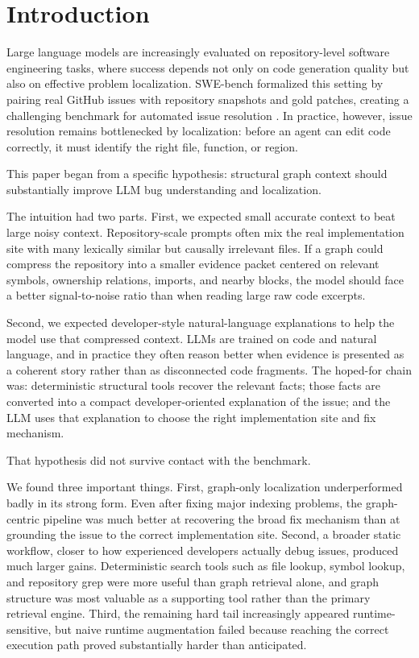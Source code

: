 \documentclass[11pt]{article}
\begin{document}
\section{Introduction}

Large language models are increasingly evaluated on repository-level software engineering tasks, where success depends not only on code generation quality but also on effective problem localization. SWE-bench formalized this setting by pairing real GitHub issues with repository snapshots and gold patches, creating a challenging benchmark for automated issue resolution \citep{jimenez2023swebench}. In practice, however, issue resolution remains bottlenecked by localization: before an agent can edit code correctly, it must identify the right file, function, or region.

This paper began from a specific hypothesis: structural graph context should substantially improve LLM bug understanding and localization.

The intuition had two parts. First, we expected small accurate context to beat large noisy context. Repository-scale prompts often mix the real implementation site with many lexically similar but causally irrelevant files. If a graph could compress the repository into a smaller evidence packet centered on relevant symbols, ownership relations, imports, and nearby blocks, the model should face a better signal-to-noise ratio than when reading large raw code excerpts.

Second, we expected developer-style natural-language explanations to help the model use that compressed context. LLMs are trained on code and natural language, and in practice they often reason better when evidence is presented as a coherent story rather than as disconnected code fragments. The hoped-for chain was: deterministic structural tools recover the relevant facts; those facts are converted into a compact developer-oriented explanation of the issue; and the LLM uses that explanation to choose the right implementation site and fix mechanism.

That hypothesis did not survive contact with the benchmark.

We found three important things. First, graph-only localization underperformed badly in its strong form. Even after fixing major indexing problems, the graph-centric pipeline was much better at recovering the broad fix mechanism than at grounding the issue to the correct implementation site. Second, a broader static workflow, closer to how experienced developers actually debug issues, produced much larger gains. Deterministic search tools such as file lookup, symbol lookup, and repository grep were more useful than graph retrieval alone, and graph structure was most valuable as a supporting tool rather than the primary retrieval engine. Third, the remaining hard tail increasingly appeared runtime-sensitive, but naive runtime augmentation failed because reaching the correct execution path proved substantially harder than anticipated.
\end{document}
